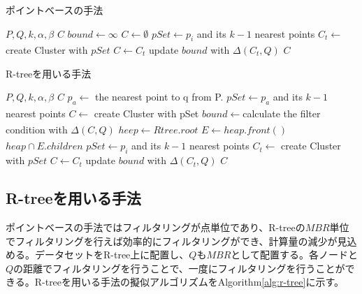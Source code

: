 \documentclass{deimj}
\theoremstyle{definition}
\begin{document}
\begin{algorithm}                      
\caption{ポイントベースの手法}         
\label{alg:point}
\begin{algorithmic}[1]                  
\renewcommand{\algorithmicrequire}{\textbf{Input:}}
\renewcommand{\algorithmicensure}{\textbf{Output:}}
\REQUIRE $P,Q,k,\alpha, \beta$
\ENSURE $C$
\STATE $bound \xleftarrow[]{} \infty$
\STATE $C \xleftarrow[]{} \emptyset$
\STATE $pSet \xleftarrow{} p_i$ and its $k-1$ nearest points
\STATE $C_t \xleftarrow{}$ create Cluster with $pSet$
\STATE $C \xleftarrow{} C_t$
\STATE update $bound$ with $\Delta(C_t,Q)$
\ENDIF
\ENDIF
\ENDFOR
\RETURN $C$
\end{algorithmic}
\end{algorithm}

\begin{algorithm}                      
\caption{R-treeを用いる手法}         
\label{alg:r-tree}
\begin{algorithmic}[1]                  
\renewcommand{\algorithmicrequire}{\textbf{Input:}}
\renewcommand{\algorithmicensure}{\textbf{Output:}}
\REQUIRE $P,Q,k,\alpha, \beta$
\ENSURE $C$
\STATE $p_a \xleftarrow[]{}$ the nearest point to q from P.
\STATE $pSet \xleftarrow{} p_a$ and its $k-1$ nearest points
\STATE $C \xleftarrow[]{}$ create Cluster with pSet
\STATE $bound \xleftarrow[]{} $calculate the filter condition with $\Delta(C,Q)$
\STATE $heep \xleftarrow[]{} Rtree.root$
\STATE $E \xleftarrow[]{}heap.front()$
\STATE $heap \cap E.children$
\ENDIF
{}
\STATE $pSet \xleftarrow{} p_i$ and its $k-1$ nearest points
\STATE $C_t \xleftarrow{}$ create Cluster with $pSet$
\STATE $C \xleftarrow{} C_t$
\STATE update $bound$ with $\Delta(C_t,Q)$
\ENDIF
\ENDIF
\ENDFOR
\ENDIF
\ENDIF
\ENDWHILE
\RETURN $C$
\end{algorithmic}
\end{algorithm}

\subsection{R-treeを用いる手法}
ポイントベースの手法ではフィルタリングが点単位であり、R-treeの$MBR$単位でフィルタリングを行えば効率的にフィルタリングができ、計算量の減少が見込める。データセットをR-tree上に配置し、$Q$も$MBR$として配置する。各ノードと$Q$の距離でフィルタリングを行うことで、一度にフィルタリングを行うことができる。R-treeを用いる手法の擬似アルゴリズムをAlgorithm\ref{alg:r-tree}に示す。
\end{document}
